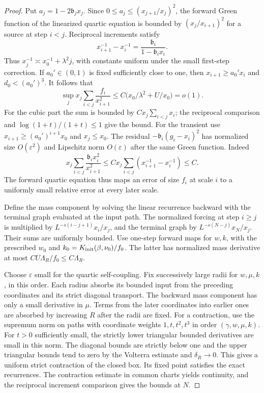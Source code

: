 \documentclass[11pt]{article}
\theoremstyle{definition}
\begin{document}
\begin{proof}
Put \(a_j=1-2\mathfrak b_j x_j\). Since
\(0\le a_j\le (x_{j+1}/x_j)^2\), the forward Green function of the
linearized quartic equation is bounded by
\((x_j/x_{i+1})^2\) for a source at step \(i<j\).
Reciprocal increments satisfy
\begin{equation}
 x_{i+1}^{-1}-x_i^{-1}=\frac{\mathfrak b_i}{1-\mathfrak b_i x_i}.
\end{equation}
Thus \(x_j^{-1}\asymp x_0^{-1}+\lambda^2 j\), with constants
uniform under the small first-step correction. If \(a_0'\in(0,1)\)
is fixed sufficiently close to one, then \(x_{i+1}\ge a_0'x_i\)
and \(d_0<(a_0')^3\). It follows that
\begin{equation}
 \sup_j x_j\sum_{i<j}\frac{f_i}{x_{i+1}^2}
       \le C\bigl(x_0/\lambda^2+U/x_0\bigr)=o(1).
\end{equation}
For the cubic part the sum is bounded by
\(C x_j\sum_{i<j}x_i\); the reciprocal comparison and
\(\log(1+t)/(1+t)\le1\) give the bound.
For the transient use \(x_{i+1}\ge (a_0')^{i+1}x_0\) and
\(x_j\le x_0\). The residual
\(-\mathfrak b_i(g_i-x_i)^2\) has normalized size \(O(\varepsilon^2)\)
and Lipschitz norm \(O(\varepsilon)\) after the same Green function.
Indeed
\begin{equation}
 x_j\sum_{i<j}\frac{\mathfrak b_i x_i^2}{x_{i+1}^2}
 \le C x_j\sum_{i<j}(x_{i+1}^{-1}-x_i^{-1})\le C.
\end{equation}
The forward quartic equation thus maps an error of size \(f_i\)
at scale \(i\) to a uniformly small relative error at every later
scale.

Define the mass component by solving the linear recurrence backward
with the terminal graph evaluated at the input path. The normalized
forcing at step \(i\ge j\) is multiplied by
\(L^{-s(i-j+1)}x_i/x_j\), and the terminal graph by
\(L^{-s(N-j)}x_N/x_j\). Their sums are uniformly bounded.
Use one-step forward maps for \(w,k\), with the prescribed \(w_0\)
and \(k_0=K_{\rm init}(\beta,\nu_0)/f_0\). The latter has
normalized mass derivative at most
\(CU\Lambda_R/f_0\le C\Lambda_R\).

Choose \(\varepsilon\) small for the quartic self-coupling.
Fix successively large radii for \(w,\mu,k\), in this order.
Each radius absorbs its bounded input from the preceding
coordinates and its strict diagonal transport. The backward mass
component has only a small derivative in \(\mu\). Terms from the
later coordinates into earlier ones are absorbed by increasing
\(R\) after the radii are fixed. For a contraction, use the
supremum norm on paths with coordinate weights
\(1,t,t^2,t^3\) in order \((\gamma,w,\mu,k)\).
For \(t>0\) sufficiently small, the strictly lower triangular
bounded derivatives are small in this norm. The diagonal bounds
are strictly below one and the upper triangular bounds tend to
zero by the Volterra estimate and \(\delta_R\to0\).
This gives a uniform strict contraction of the closed box.
Its fixed point satisfies the exact recurrences. The contraction
estimate in common charts yields continuity, and the reciprocal
increment comparison gives the bounds at \(N\).
\end{proof}
\end{document}
